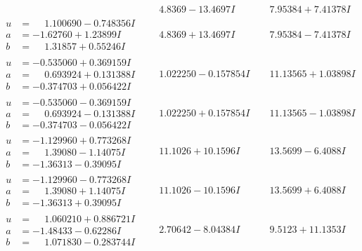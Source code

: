 \documentclass[1p]{elsarticle_modified}
\theoremstyle{definition}
\begin{document}
$$\begin{array}{c|c|c}
 & \phantom{-}4.8369 - 13.4697 I & \phantom{-}7.95384 + 7.41378 I \\ \hline\begin{aligned}
u &= \phantom{-}1.100690 - 0.748356 I \\
a &= -1.62760 + 1.23899 I \\
b &= \phantom{-}1.31857 + 0.55246 I\end{aligned}
 & \phantom{-}4.8369 + 13.4697 I & \phantom{-}7.95384 - 7.41378 I \\ \hline\begin{aligned}
u &= -0.535060 + 0.369159 I \\
a &= \phantom{-}0.693924 + 0.131388 I \\
b &= -0.374703 + 0.056422 I\end{aligned}
 & \phantom{-}1.022250 - 0.157854 I & \phantom{-}11.13565 + 1.03898 I \\ \hline\begin{aligned}
u &= -0.535060 - 0.369159 I \\
a &= \phantom{-}0.693924 - 0.131388 I \\
b &= -0.374703 - 0.056422 I\end{aligned}
 & \phantom{-}1.022250 + 0.157854 I & \phantom{-}11.13565 - 1.03898 I \\ \hline\begin{aligned}
u &= -1.129960 + 0.773268 I \\
a &= \phantom{-}1.39080 - 1.14075 I \\
b &= -1.36313 - 0.39095 I\end{aligned}
 & \phantom{-}11.1026 + 10.1596 I & \phantom{-}13.5699 - 6.4088 I \\ \hline\begin{aligned}
u &= -1.129960 - 0.773268 I \\
a &= \phantom{-}1.39080 + 1.14075 I \\
b &= -1.36313 + 0.39095 I\end{aligned}
 & \phantom{-}11.1026 - 10.1596 I & \phantom{-}13.5699 + 6.4088 I \\ \hline\begin{aligned}
u &= \phantom{-}1.060210 + 0.886721 I \\
a &= -1.48433 - 0.62286 I \\
b &= \phantom{-}1.071830 - 0.283744 I\end{aligned}
 & \phantom{-}2.70642 - 8.04384 I & \phantom{-}9.5123 + 11.1353 I \\ \hline\begin{aligned}

\end{aligned}
\end{array}$$
\end{document}

